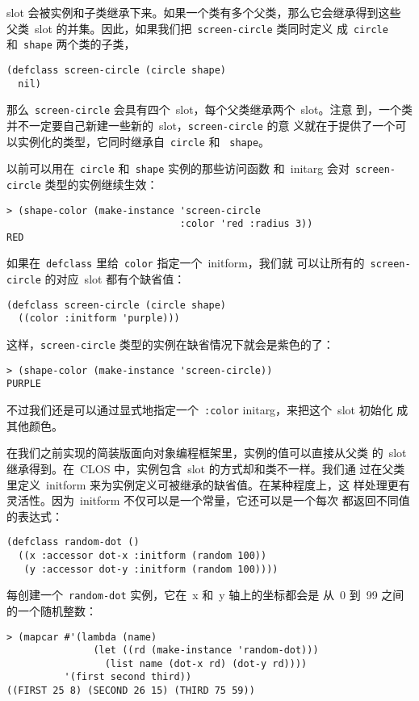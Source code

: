 slot 会被实例和子类继承下来。如果一个类有多个父类，那么它会继承得到这些
父类~slot 的并集。因此，如果我们把~\texttt{screen-circle} 类同时定义
成~\texttt{circle} 和~\texttt{shape} 两个类的子类，
\begin{lstlisting}
(defclass screen-circle (circle shape)
  nil)
\end{lstlisting}
那么~\texttt{screen-circle} 会具有四个~slot，每个父类继承两个~slot。注意
到，一个类并不一定要自己新建一些新的~slot，\texttt{screen-circle} 的意
义就在于提供了一个可以实例化的类型，它同时继承自~\texttt{circle} 和
~\texttt{shape}。

以前可以用在~\texttt{circle} 和~\texttt{shape} 实例的那些访问函数
和~initarg 会对~\texttt{screen-circle} 类型的实例继续生效：
\begin{lstlisting}
> (shape-color (make-instance 'screen-circle
                              :color 'red :radius 3))
RED
\end{lstlisting}
如果在~\texttt{defclass} 里给~\texttt{color} 指定一个~initform，我们就
可以让所有的~\texttt{screen-circle} 的对应~slot 都有个缺省值：
\begin{lstlisting}
(defclass screen-circle (circle shape)
  ((color :initform 'purple)))
\end{lstlisting}
这样，\texttt{screen-circle} 类型的实例在缺省情况下就会是紫色的了：
\begin{lstlisting}
> (shape-color (make-instance 'screen-circle))
PURPLE
\end{lstlisting}
不过我们还是可以通过显式地指定一个~\texttt{:color} initarg，来把这个~slot 初始化
成其他颜色。

在我们之前实现的简装版面向对象编程框架里，实例的值可以直接从父类
的~slot 继承得到。在~CLOS 中，实例包含~slot 的方式却和类不一样。我们通
过在父类里定义~initform 来为实例定义可被继承的缺省值。在某种程度上，这
样处理更有灵活性。因为~initform 不仅可以是一个常量，它还可以是一个每次
都返回不同值的表达式：
\begin{lstlisting}
(defclass random-dot ()
  ((x :accessor dot-x :initform (random 100))
   (y :accessor dot-y :initform (random 100))))
\end{lstlisting}
每创建一个~\texttt{random-dot} 实例，它在~x 和~y 轴上的坐标都会是
从~0 到~99 之间的一个随机整数：
\begin{lstlisting}
> (mapcar #'(lambda (name)
               (let ((rd (make-instance 'random-dot)))
                 (list name (dot-x rd) (dot-y rd))))
          '(first second third))
((FIRST 25 8) (SECOND 26 15) (THIRD 75 59))
\end{lstlisting}

